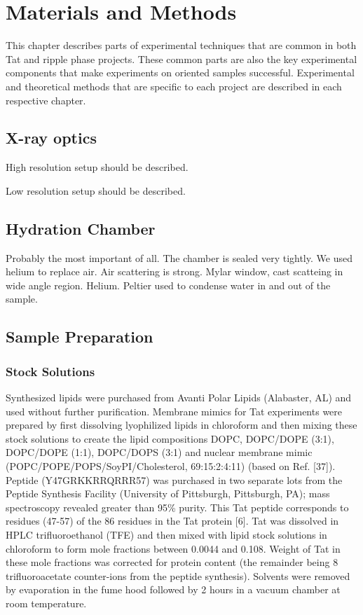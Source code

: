 \chapter{Materials and Methods}
This chapter describes parts of experimental techniques that are common
in both Tat and ripple phase projects.
These common parts are also the key experimental components that make
experiments on oriented samples successful. Experimental and theoretical
methods that are specific to each project are described in each
respective chapter.

\section{X-ray optics}
High resolution setup should be described.

Low resolution setup should be described.

\section{Hydration Chamber}
Probably the most important of all.
The chamber is sealed very tightly. We used helium to replace air. Air 
scattering is strong. 
Mylar window, cast scatteing in wide angle region. Helium. Peltier used to 
condense water in and out of the sample.  

\section{Sample Preparation}
\subsection{Stock Solutions}
Synthesized lipids were purchased from Avanti Polar Lipids (Alabaster, AL) and 
used without further purification. Membrane mimics for Tat experiments 
were prepared by first 
dissolving lyophilized lipids in chloroform and then mixing these stock 
solutions to create the lipid compositions
DOPC, DOPC/DOPE (3:1), DOPC/DOPE (1:1), DOPC/DOPS (3:1) and nuclear membrane
mimic (POPC/POPE/POPS/SoyPI/Cholesterol, 69:15:2:4:11) (based on Ref. [37]). 
Peptide
(Y47GRKKRRQRRR57) was purchased in two separate lots from the Peptide Synthesis 
Facility
(University of Pittsburgh, Pittsburgh, PA); mass spectroscopy revealed greater
than 95\% 
purity. This Tat
peptide corresponds to residues (47-57) of the 86 residues in the Tat 
protein [6]. Tat was
dissolved in HPLC trifluoroethanol (TFE) and then mixed with lipid stock 
solutions in
chloroform to form mole fractions between 0.0044 and 0.108. Weight of Tat in 
these mole
fractions was corrected for protein content (the remainder being 8 
trifluoroacetate counter-ions
from the peptide synthesis). Solvents were removed by evaporation in the fume 
hood followed
by 2 hours in a vacuum chamber at room temperature.

